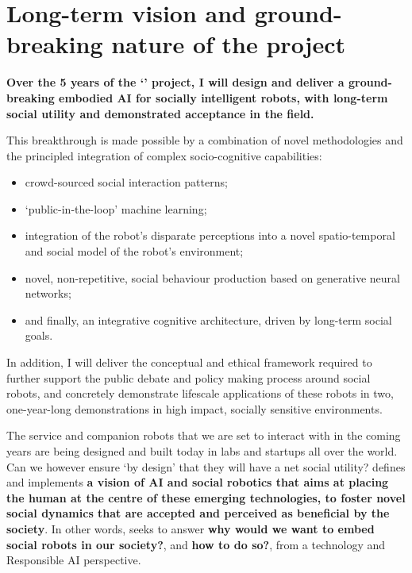 \section{Long-term vision and ground-breaking nature of the project}

\begin{framed}

\noindent\bf Over the 5 years of the `\project' project, I will design and deliver a ground-breaking embodied AI for
socially intelligent robots, with long-term social utility and demonstrated
    acceptance in the field.

\vspace{0.3em}
\noindent This breakthrough is made possible by a combination of novel methodologies and
the principled integration of complex socio-cognitive capabilities:

\begin{itemize}
        \item crowd-sourced social interaction patterns;
        \item `public-in-the-loop' machine learning;
        \item integration of the robot's disparate perceptions into a novel
            spatio-temporal and social model of the robot's environment;
        \item novel, non-repetitive, social behaviour production based on
            generative neural networks;
        \item and finally, an integrative cognitive architecture, driven by
            long-term social goals.
\end{itemize}

\vspace{0.3em}
\noindent In addition, I will deliver the conceptual and ethical framework required to
further support the public debate and policy making process around social
robots, and concretely demonstrate lifescale applications of these robots in
two, one-year-long demonstrations in high impact, socially sensitive environments.

\end{framed}

The service and companion robots that we are set to interact with in the coming
years are being designed and built today in labs and startups all over the
world. Can we however ensure `by design' that they will have a net social
utility?  \project defines and implements \textbf{a vision of AI and social
robotics that aims at placing the human at the centre of these emerging
technologies, to foster novel social dynamics that are accepted and perceived as
beneficial by the society}. In other words, \project seeks to answer \textbf{why
would we want to embed social robots in our society?}, and \textbf{how to do
so?}, from a technology and Responsible AI perspective.

